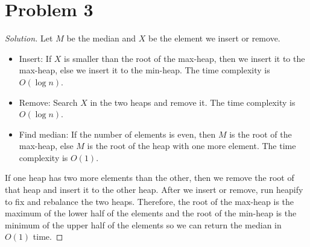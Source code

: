\documentclass[12pt]{article}
\newenvironment*{solution}{\begin{proof}[Solution]}{\end{proof}}
\begin{document}
\section*{Problem 3}
\begin{solution}
    Let \(M\) be the median and \(X\) be the element we insert or remove.
    \begin{itemize}
        \item Insert: If \(X\) is smaller than the root of the max-heap, then
        we insert it to the max-heap, else we insert it to the min-heap. The
        time complexity is \(O(\log n)\).
        \item Remove: Search \(X\) in the two heaps and remove it. The time
        complexity is \(O(\log n)\).
        \item Find median: If the number of elements is even, then \(M\) is
        the root of the max-heap, else \(M\) is the root of the heap with one
        more element. The time complexity is \(O(1)\).
    \end{itemize}
    If one heap has two more elements than the other, then we remove the root
    of that heap and insert it to the other heap. After we insert or remove,
    run heapify to fix and rebalance the two heaps. Therefore, the root of the
    max-heap is the maximum of the lower half of the elements and the root of
    the min-heap is the minimum of the upper half of the elements so we can
    return the median in \(O(1)\) time.
\end{solution}
\end{document}
